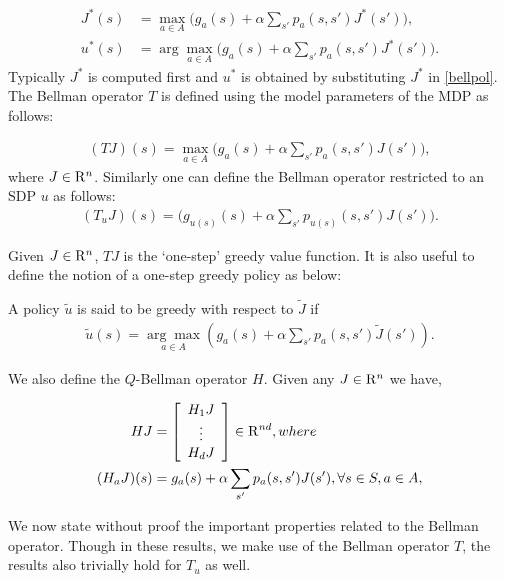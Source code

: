 \documentclass[12pt,draftcls,onecolumn]{IEEEtran}
\begin{document}
\begin{subequations}\label{bell}
\begin{align}
\label{bellval}J^*(s)&=\max_{ a\in A}\big(g_a(s)+\alpha \sum_{s'}p_a(s,s')J^*(s')\big),\\
\label{bellpol}u^*(s)&=\arg\max_{ a\in A}\big(g_a(s)+\alpha \sum_{s'}p_a(s,s')J^*(s')\big).
\end{align}
\end{subequations}
Typically $J^*$ is computed first and $u^*$ is obtained by substituting $J^*$ in \eqref{bellpol}. The Bellman operator $T$ is defined using the model parameters of the MDP as follows:
\begin{definition}
\begin{align}
(TJ)(s)=\max_{a \in A}\big(g_a(s)+\alpha \sum_{s'} p_a(s,s')J(s')\big), 
\end{align}
where $J\in \mathrm{R}^n$. Similarly one can define the Bellman operator restricted to an SDP $u$ as follows:
\begin{align}
(T_uJ)(s)=\big(g_{u(s)}(s)+\alpha \sum_{s'} p_{u(s)}(s,s')J(s')\big).
\end{align}
\end{definition}
Given $J \in \mathrm{R}^n$, $TJ$ is the `one-step' greedy value function. It is also useful to define the notion of a one-step greedy policy as below:
\begin{definition}
A policy $\tilde{u}$ is said to be greedy with respect to $\tilde{J}$ if
\begin{align}\label{subpol}
\tilde{u}(s)=\underset{a \in A}{\arg\max}(g_a(s)+\alpha\sum_{s'} p_a(s,s')\tilde{J}(s')).
\end{align}
\end{definition}
\begin{definition}
We also define the $Q$-Bellman operator \cite{BertB} $H$. Given any $J\in \mathrm{R}^n$ we have,

\begin{align}
HJ&=\left[ {\begin{array}{c} H_1 J  \\ \vdots \\ H_d J\end{array}} \right]\in \mathrm{R}^{nd},\relax{where}\nonumber\\
(H_a J)(s)&= g_a(s)+\alpha \sum_{s'}p_a(s,s') J(s'), \forall s\in S, a\in A,
\end{align}
\end{definition}
 We now state without proof the important properties related to the Bellman operator. Though in these results, we make use of the Bellman operator $T$, the results also trivially hold for $T_u$ as well.
\end{document}
